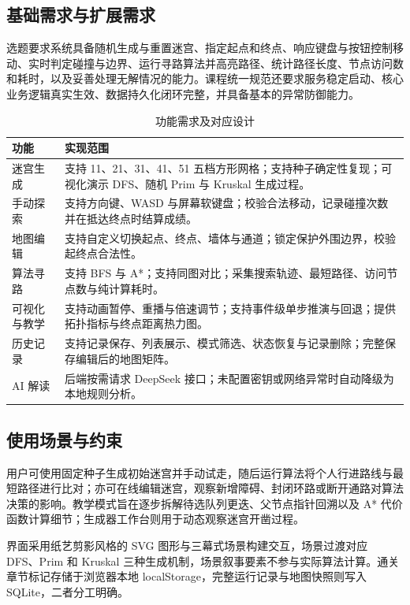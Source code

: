 \documentclass[a4paper]{article}
\begin{document}
\subsection{基础需求与扩展需求}
选题要求系统具备随机生成与重置迷宫、指定起点和终点、响应键盘与按钮控制移动、实时判定碰撞与边界、运行寻路算法并高亮路径、统计路径长度、节点访问数和耗时，以及妥善处理无解情况的能力。课程统一规范还要求服务稳定启动、核心业务逻辑真实生效、数据持久化闭环完整，并具备基本的异常防御能力。

\begin{table}[htbp]
\centering
\caption{功能需求及对应设计}
\small
\begin{tabularx}{\textwidth}{p{2.2cm}X}
\toprule
功能 & 实现范围 \\
\midrule
迷宫生成 & 支持 11、21、31、41、51 五档方形网格；支持种子确定性复现；可视化演示 DFS、随机 Prim 与 Kruskal 生成过程。\\
手动探索 & 支持方向键、WASD 与屏幕软键盘；校验合法移动，记录碰撞次数并在抵达终点时结算成绩。\\
地图编辑 & 支持自定义切换起点、终点、墙体与通道；锁定保护外围边界，校验起终点合法性。\\
算法寻路 & 支持 BFS 与 A*；支持同图对比；采集搜索轨迹、最短路径、访问节点数与纯计算耗时。\\
可视化与教学 & 支持动画暂停、重播与倍速调节；支持事件级单步推演与回退；提供拓扑指标与终点距离热力图。\\
历史记录 & 支持记录保存、列表展示、模式筛选、状态恢复与记录删除；完整保存编辑后的地图矩阵。\\
AI 解读 & 后端按需请求 DeepSeek 接口；未配置密钥或网络异常时自动降级为本地规则分析。\\
\bottomrule
\end{tabularx}
\end{table}

\subsection{使用场景与约束}
用户可使用固定种子生成初始迷宫并手动试走，随后运行算法将个人行进路线与最短路径进行比对；亦可在线编辑迷宫，观察新增障碍、封闭环路或断开通路对算法决策的影响。教学模式旨在逐步拆解待选队列更迭、父节点指针回溯以及 A* 代价函数计算细节；生成器工作台则用于动态观察迷宫开凿过程。

界面采用纸艺剪影风格的 SVG 图形与三幕式场景构建交互，场景过渡对应 DFS、Prim 和 Kruskal 三种生成机制，场景叙事要素不参与实际算法计算。通关章节标记存储于浏览器本地 localStorage，完整运行记录与地图快照则写入 SQLite，二者分工明确。
\end{document}
